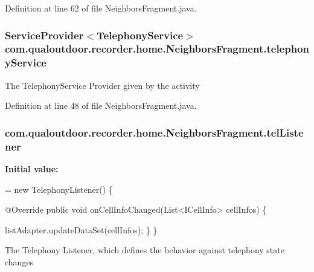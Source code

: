 Definition at line 62 of file Neighbors\-Fragment.\-java.

\hypertarget{classcom_1_1qualoutdoor_1_1recorder_1_1home_1_1NeighborsFragment_aac56a378ef0f696f5f1411d06a9bb519}{
\subsubsection[{telephony\-Service}]{\setlength{\rightskip}{0pt plus 5cm}Service\-Provider$<${\bf Telephony\-Service}$>$ com.\-qualoutdoor.\-recorder.\-home.\-Neighbors\-Fragment.\-telephony\-Service\hspace{0.3cm}{\ttfamily [private]}}}\label{classcom_1_1qualoutdoor_1_1recorder_1_1home_1_1NeighborsFragment_aac56a378ef0f696f5f1411d06a9bb519}
The Telephony\-Service Provider given by the activity 

Definition at line 48 of file Neighbors\-Fragment.\-java.

\hypertarget{classcom_1_1qualoutdoor_1_1recorder_1_1home_1_1NeighborsFragment_ae1f6f2467a89a24ccbe71cd88ed425b7}{
\subsubsection[{tel\-Listener}]{ com.\-qualoutdoor.\-recorder.\-home.\-Neighbors\-Fragment.\-tel\-Listener\hspace{0.3cm}{\ttfamily [private]}}}\label{classcom_1_1qualoutdoor_1_1recorder_1_1home_1_1NeighborsFragment_ae1f6f2467a89a24ccbe71cd88ed425b7}
{\bfseries Initial value\-:}
\begin{DoxyCode}
= \textcolor{keyword}{new} TelephonyListener() \{

        @Override
        \textcolor{keyword}{public} \textcolor{keywordtype}{void} onCellInfoChanged(List<ICellInfo> cellInfos) \{
            
            listAdapter.updateDataSet(cellInfos);
        \}
    \}
\end{DoxyCode}
The Telephony Listener, which defines the behavior against telephony state changes 


